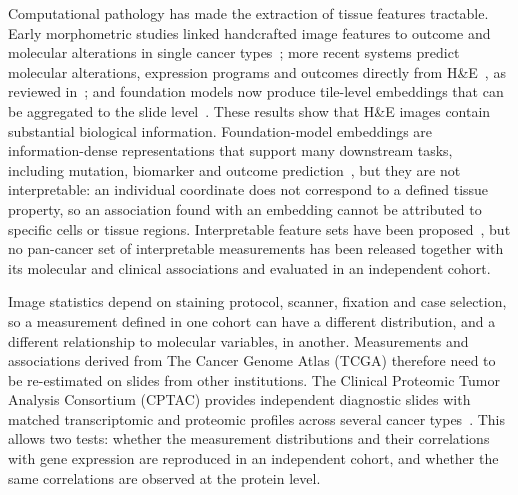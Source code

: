 Computational pathology has made the extraction of tissue features tractable.
Early morphometric studies linked handcrafted image features to outcome and
molecular alterations in single cancer types~\cite{beck2011, cooper2015, yu2016}; more recent systems
predict molecular alterations, expression programs and outcomes directly from
H\&E~\cite{coudray2018, schmauch2020he2rna, bannier2024}, as reviewed
in~\cite{echle2021}; and foundation models now produce tile-level embeddings
that can be aggregated to the slide
level~\cite{chen2024uni, vorontsov2024virchow, hoptimus0}. These results
show that H\&E images contain substantial biological information. Foundation-model
embeddings are information-dense representations that support many downstream
tasks, including mutation, biomarker and outcome
prediction~\cite{filiot2023phikon, filiot2024phikonv2, bannier2024, bannier2024her2},
but they are not interpretable: an individual coordinate does not
correspond to a defined tissue property, so an association found with an
embedding cannot be attributed to specific cells or tissue regions.
Interpretable feature sets have been proposed~\cite{diao2021hif, abel2024}, but
no pan-cancer set of interpretable measurements has been released together with
its molecular and clinical associations and evaluated in an independent cohort.

Image statistics depend on staining protocol, scanner, fixation and case
selection, so a measurement defined in one cohort can have a different
distribution, and a different relationship to molecular variables, in another.
Measurements and associations derived from The Cancer Genome Atlas (TCGA)
therefore need to be re-estimated on slides from other institutions. The Clinical
Proteomic Tumor Analysis Consortium (CPTAC) provides independent diagnostic slides
with matched transcriptomic and proteomic profiles across several cancer
types~\cite{li2023cptac}. This allows two tests: whether the measurement
distributions and their correlations with gene expression are reproduced in an
independent cohort, and whether the same correlations are observed at the
protein level.

